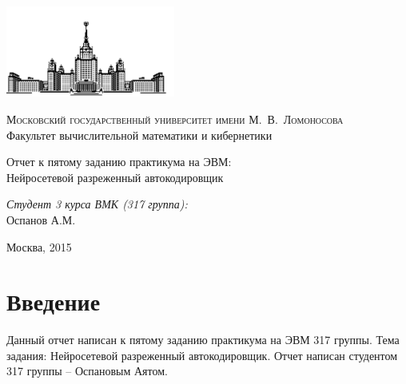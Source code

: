 \documentclass[12pt, a4paper]{article}
\begin{document}
	\thispagestyle{empty}

	\begin{singlespace}
	\begin{titlepage}
		\begin{center}
			\includegraphics[height = 3cm]{msu.png}

			{\scshape Московский государственный университет имени М.~В.~Ломоносова}\\
			Факультет вычислительной математики и кибернетики\\
			\centerline{\hfill\hrulefill\hrulefill\hrulefill\hrulefill\hfill}

			\vfill

			{\LARGE Отчет к пятому заданию практикума на ЭВМ: \\ Нейросетевой разреженный автокодировщик}

			\vspace{1cm}

		\end{center}

		\vfill
		\begin{flushright}
			\textit{Студент 3 курса ВМК (317 группа):}\\
				Оспанов А.М.

			\vspace{5mm}

		\end{flushright}

		\vfill

		\begin{center}
		Москва, 2015
		\end{center}
	\end{titlepage}
	\end{singlespace}

	\tableofcontents


	\newpage
	\section{Введение}
		Данный отчет написан к пятому заданию практикума на ЭВМ 317 группы. Тема задания: Нейросетевой разреженный автокодировщик. Отчет написан студентом 317 группы -- Оспановым Аятом.
\end{document}

